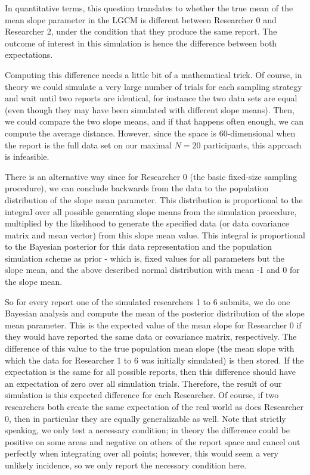 \documentclass[man]{apa7}
\theoremstyle{definition}
\begin{document}
In quantitative terms, this question translates to whether the true mean of the mean slope parameter in the LGCM is different between Researcher 0 and Researcher 2, under the condition that they produce the same report. The outcome of interest in this simulation is hence the difference between both expectations.

Computing this difference needs a little bit of a mathematical trick. Of course, in theory we could simulate a very large number of trials for each sampling strategy and wait until two reports are identical, for instance the two data sets are equal (even though they may have been simulated with different slope means). Then, we could compare the two slope means, and if that happens often enough, we can compute the average distance. However, since the space is 60-dimensional when the report is the full data set on our maximal $N=20$ participants, this approach is infeasible. 

There is an alternative way since for Researcher 0 (the basic fixed-size sampling procedure), we can conclude backwards from the data to the population distribution of the slope mean parameter. This distribution is proportional to the integral over all possible generating slope means from the simulation procedure, multiplied by the likelihood to generate the specified data (or data covariance matrix and mean vector) from this slope mean value. This integral is proportional to the Bayesian posterior for this data representation and the population simulation scheme as prior - which is, fixed values for all parameters but the slope mean, and the above described normal distribution with mean -1 and 0 for the slope mean. 

So for every report one of the simulated researchers 1 to 6 submits, we do one Bayesian analysis and compute the mean of the posterior distribution of the slope mean parameter. This is the expected value of the mean slope for Researcher 0 if they would have reported the same data or covariance matrix, respectively. The difference of this value to the true population mean slope (the mean slope with which the data for Researcher 1 to 6 was initially simulated) is then stored. If the expectation is the same for all possible reports, then this difference should have an expectation of zero over all simulation trials. Therefore, the result of our simulation is this expected difference for each Researcher. Of course, if two researchers both create the same expectation of the real world as does Researcher 0, then in particular they are equally generalizable as well. Note that strictly speaking, we only test a necessary condition; in theory the difference could be positive on some areas and negative on others of the report space and cancel out perfectly when integrating over all points; however, this would seem a very unlikely incidence, so we only report the necessary condition here.
\end{document}
